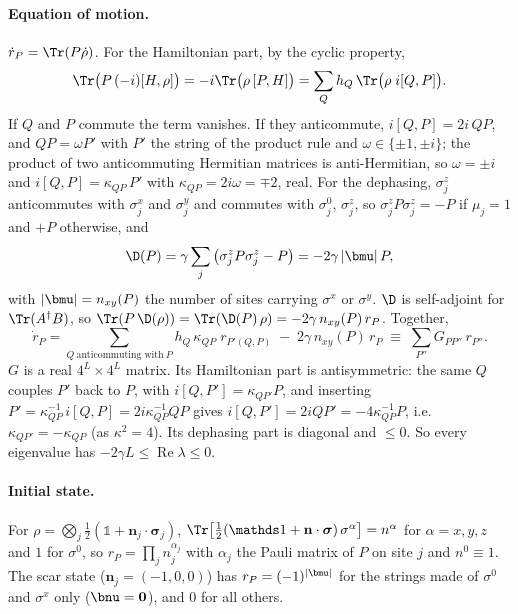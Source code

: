 \paragraph{Equation of motion.} $\dot r_P = \Tr(P\dot\rho)$. For the Hamiltonian part, by the cyclic property,
\[ \Tr\big(P\,(-i)[H,\rho]\big) = -i\Tr\big(\rho\,[P, H]\big) = \sum_Q h_Q\,\Tr\big(\rho\; i[Q, P]\big). \]
If $Q$ and $P$ commute the term vanishes. If they anticommute, $i[Q,P] = 2i\,QP$, and $QP = \omega P'$ with $P'$ the string of the product rule and $\omega \in \{\pm1, \pm i\}$; the product of two anticommuting Hermitian matrices is anti-Hermitian, so $\omega = \pm i$ and $i[Q,P] = \kappa_{QP}\,P'$ with $\kappa_{QP} = 2i\omega = \mp2$, real. For the dephasing, $\sigma^z_j$ anticommutes with $\sigma^x_j$ and $\sigma^y_j$ and commutes with $\sigma^0_j$, $\sigma^z_j$, so $\sigma^z_jP\sigma^z_j = -P$ if $\mu_j = 1$ and $+P$ otherwise, and
\[ \D(P) = \gamma\sum_j\big(\sigma^z_jP\sigma^z_j - P\big) = -2\gamma\,\lvert\bmu\rvert\,P, \]
with $\lvert\bmu\rvert = n_{xy}(P)$ the number of sites carrying $\sigma^x$ or $\sigma^y$. $\D$ is self-adjoint for $\Tr(A^\dagger B)$, so $\Tr(P\,\D(\rho)) = \Tr(\D(P)\,\rho) = -2\gamma\, n_{xy}(P)\, r_P$. Together,
\begin{equation}
\dot r_P = \sum_{Q\ \text{anticommuting with}\ P} h_Q\,\kappa_{QP}\; r_{P'(Q,P)} \;-\; 2\gamma\, n_{xy}(P)\, r_P \;\equiv\; \sum_{P''} G_{PP''}\,r_{P''} .
\label{eq:generator}
\end{equation}
$G$ is a real $4^L\times4^L$ matrix. Its Hamiltonian part is antisymmetric: the same $Q$ couples $P'$ back to $P$, with $i[Q, P'] = \kappa_{QP'}P$, and inserting $P' = \kappa_{QP}^{-1}\, i[Q,P] = 2i\kappa_{QP}^{-1}QP$ gives $i[Q,P'] = 2iQP' = -4\kappa_{QP}^{-1}P$, i.e.\ $\kappa_{QP'} = -\kappa_{QP}$ (as $\kappa^2 = 4$). Its dephasing part is diagonal and $\le 0$. So every eigenvalue has $-2\gamma L \le \operatorname{Re}\lambda \le 0$.

\paragraph{Initial state.} For $\rho = \bigotimes_j\tfrac12(\mathds 1 + \mathbf n_j\cdot\boldsymbol\sigma_j)$, $\Tr\big[\tfrac12(\mathds 1 + \mathbf n\cdot\boldsymbol\sigma)\,\sigma^\alpha\big] = n^\alpha$ for $\alpha = x, y, z$ and $1$ for $\sigma^0$, so $r_P = \prod_j n_j^{\alpha_j}$ with $\alpha_j$ the Pauli matrix of $P$ on site $j$ and $n^0 \equiv 1$. The scar state ($\mathbf n_j = (-1, 0, 0)$) has $r_P = (-1)^{\lvert\bmu\rvert}$ for the strings made of $\sigma^0$ and $\sigma^x$ only ($\bnu = \mathbf 0$), and $0$ for all others.

